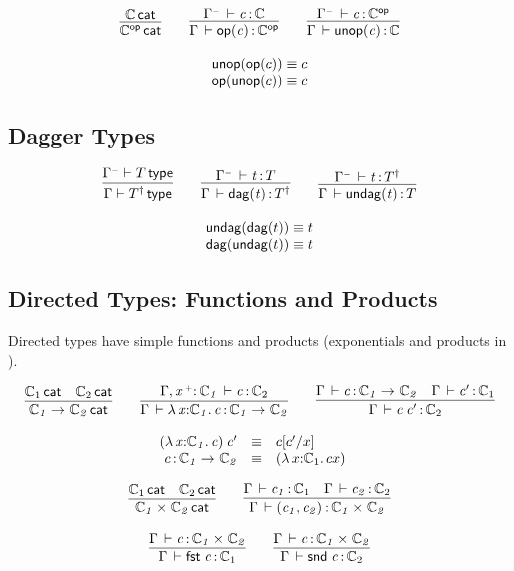 \documentclass[11pt]{article}
\theoremstyle{plain}
\begin{document}
\[
\begin{array}{c}
\infer{\wfdtp{\optp{\C}}}
      {\wfdtp{\C}}
\qquad
\infer{\ofdtp{\Gamma}{\optm{c}}{\optp{\C}}}
      {\ofdtp{\Gamma^\con}{c}{\C}}
\qquad
\infer{\ofdtp{\Gamma}{\unop{c}}{{\C}}}
      {\ofdtp{\Gamma^\con}{c}{\optp{\C}}}
\\ \\
\unop{\optm{c}} \deq c \\
\optm{\unop{c}} \deq c
\end{array}
\]

\subsection{Dagger Types}

\[
\begin{array}{c}
\infer{\wftp{\Gamma}{\dagtp{T}}}
      {\wftp{\Gamma^\con}{T}}
\qquad
\infer{\oftp{\Gamma}{\dagtm{t}}{\dagtp{T}}}
      {\oftp{\Gamma^\con}{t}{T}}
\qquad
\infer{\oftp{\Gamma}{\undag{t}}{{T}}}
      {\oftp{\Gamma^\con}{t}{\dagtp{T}}}
\\ \\
\undag{\dagtm{t}} \deq t \\
\dagtm{\undag{t}} \deq t
\end{array}
\]

\subsection{Directed Types: Functions and Products}

Directed types have simple functions and products (exponentials and
products in \Cat).

\[
\begin{array}{c}
\infer{\wfdtp{\arr{\C_1}{\C_2}}}
      {\wfdtp{\C_1} &
        \wfdtp{\C_2}}
\qquad
\infer{\ofdtp{\Gamma}{\lam{x}{\C_1}{c}}{\arr {\C_1} {\C_2}}}
      {\ofdtp{\Gamma,\vptptm{x}{\co}{\C_1}}{c}{\C_2}}
\qquad
\infer{\ofdtp{\Gamma}{\app c {c'}}{\C_2}}
      {\ofdtp{\Gamma}{c}{\arr{\C_1}{\C_2}} &
        \ofdtp{\Gamma}{c'}{\C_1}}
\end{array}
\]

\[
\begin{array}{rcll}
\mathit{({\lambda\,x \mathit{:} \mathbb{C}_1.\,c}) \: c'} & \equiv & c [ c' / x ] \\
c \, \mathit{:} \, \mathit{\mathbb{C}_1}\rightarrow_{\mathit{}} \mathit{\mathbb{C}_2} & \equiv & {({\lambda\,x \mathit{:} \mathbb{C}_1.\,c}{x})} &
\end{array} \\
\]

\[
\begin{array}{c}
\infer{\wfdtp{\prd{\C_1}{\C_2}}}
      {\wfdtp{\C_1} &
        \wfdtp{\C_2}}
\qquad
\infer{\ofdtp{\Gamma}{\pair{c_1}{c_2}}{\prd {\C_1} {\C_2}}}
      {\ofdtp{\Gamma}{c_1}{\C_1} &
       \ofdtp{\Gamma}{c_2}{\C_2}}
\\ \\
\infer{\ofdtp{\Gamma}{\fst c}{\C_1}}
      {\ofdtp{\Gamma}{c}{\prd{\C_1}{\C_2}}}
\qquad
\infer{\ofdtp{\Gamma}{\snd c}{\C_2}}
      {\ofdtp{\Gamma}{c}{\prd{\C_1}{\C_2}}}
\end{array}
\]
\end{document}
